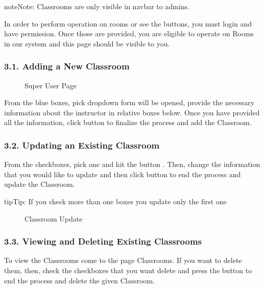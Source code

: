 \documentclass[letterpaper,10pt,english]{sphinxmanual}
\begin{document}
\begin{sphinxadmonition}{note}{Note:}
Classrooms are only visible in navbar to admins.
\end{sphinxadmonition}

In order to perform operation on rooms or see the buttons, you must login and have permission.
Once those are provided, you are eligible to operate on Rooms in our system and this page should be
visible to you.


\subsubsection{3.1. Adding a New Classroom}
\label{\detokenize{user/berkay:adding-a-new-classroom}}
\begin{figure}[htbp]
\centering
\capstart

\noindent{}
\caption{Super User Page}\label{\detokenize{user/berkay:id8}}\end{figure}

From the blue boxes, pick  dropdown form will be opened, provide the necessary information
about the instructor in relative boxes below. Once you have provided all the information, click 
button to finalize the process and add the Classroom.


\subsubsection{3.2. Updating an Existing Classroom}
\label{\detokenize{user/berkay:updating-an-existing-classroom}}
From the checkboxes, pick one and hit the button . Then, change the information that
you would like to update and then click  button to end the process and update the Classroom.

\begin{sphinxadmonition}{tip}{Tip:}
If you check more than one boxes you update only the first one
\end{sphinxadmonition}

\begin{figure}[htbp]
\centering
\capstart

\noindent{}
\caption{Classroom Update}\label{\detokenize{user/berkay:id9}}\end{figure}


\subsubsection{3.3. Viewing and Deleting Existing Classrooms}
\label{\detokenize{user/berkay:viewing-and-deleting-existing-classrooms}}
To view the Classrooms come to the page Classrooms. If you want to delete them,
then, check the checkboxes that you want delete and press the  button to
end the process and delete the given Classroom.
\end{document}
